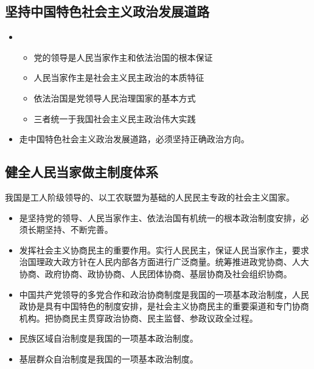     \subsection{坚持中国特色社会主义政治发展道路}
        \begin{itemize}
            \item {}
            \begin{itemize}
                \item 党的领导是人民当家作主和依法治国的根本保证
                \item 人民当家作主是社会主义民主政治的本质特征
                \item 依法治国是党领导人民治理国家的基本方式
                \item 三者统一于我国社会主义民主政治伟大实践
            \end{itemize}
            \item 走中国特色社会主义政治发展道路，必须坚持正确政治方向。
        \end{itemize}

    \subsection{健全人民当家做主制度体系}
        我国是工人阶级领导的、以工农联盟为基础的人民民主专政的社会主义国家。
        \begin{itemize}
            \item {}是坚持党的领导、人民当家作主、依法治国有机统一的根本政治制度安排，必须长期坚持、不断完善。
            \item 发挥社会主义协商民主的重要作用。实行人民民主，保证人民当家作主，要求治国理政大政方针在人民内部各方面进行广泛商量。统筹推进政党协商、人大协商、政府协商、政协协商、人民团体协商、基层协商及社会组织协商。
            \item 中国共产党领导的多党合作和政治协商制度是我国的一项基本政治制度，人民政协是具有中国特色的制度安排，是社会主义协商民主的重要渠道和专门协商机构。把协商民主贯穿政治协商、民主监督、参政议政全过程。
            \item 民族区域自治制度是我国的一项基本政治制度。
            \item 基层群众自治制度是我国的一项基本政治制度。
        \end{itemize}

